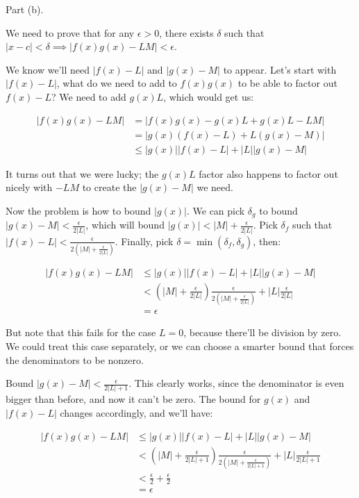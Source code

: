 \documentclass{oxmathproblems}
\begin{document}
\begin{questions}
\begin{solution}
\begin{enumerate}[label=(\alph*)]
    Part (b).

    We need to prove that for any $\epsilon > 0$, there exists $\delta$ such that $|x-c| < \delta \implies |f(x)g(x) - LM| < \epsilon$.
    
    We know we'll need $|f(x) - L|$ and $|g(x) - M|$ to appear. Let's start with $|f(x) - L|$, what do we need to add to
    $f(x)g(x)$ to be able to factor out $f(x)-L$? We need to add $g(x)L$, which would get us:
    
    \begin{align*}
      |f(x)g(x) - LM| 
      & = |f(x)g(x) - g(x)L + g(x)L - LM| \\
      & = |g(x)(f(x)-L) + L(g(x)-M)| \\
      & \leq |g(x)||f(x)-L| + |L||g(x)-M|
    \end{align*}

    It turns out that we were lucky; the $g(x)L$ factor also happens to factor out nicely with $- LM$ to create the $|g(x)-M|$ we need.

    Now the problem is how to bound $|g(x)|$. We can pick $\delta_{g}$ to bound $|g(x)-M| < \frac{\epsilon}{2|L|}$,
    which will bound $|g(x)| < |M| + \frac{\epsilon}{2|L|}$. Pick $\delta_{f}$ such that $|f(x)-L| < \frac{\epsilon}{2(|M| + \frac{\epsilon}{2|L|})}$.
    Finally, pick $\delta = \min(\delta_{f}, \delta_{g})$, then:

    \begin{align*}
      |f(x)g(x) - LM|
      & \leq |g(x)||f(x)-L| + |L||g(x)-M| \\
      & < \left(|M| + \frac{\epsilon}{2|L|}\right) \frac{\epsilon}{2(|M| + \frac{\epsilon}{2|L|})} + |L|\frac{\epsilon}{2|L|} \\
      & = \epsilon
    \end{align*}
  \end{enumerate}

  But note that this fails for the case $L = 0$, because there'll be division by zero. We could treat this case separately, or we can choose a smarter bound that forces the
  denominators to be nonzero.

  Bound $|g(x)-M| < \frac{\epsilon}{2|L|+1}$. This clearly works, since the denominator is even bigger than before, and now it can't be zero. The bound for
  $g(x)$ and $|f(x)-L|$ changes accordingly, and we'll have:

  \begin{align*}
    |f(x)g(x) - LM|
    & \leq |g(x)||f(x)-L| + |L||g(x)-M| \\
    & < \left(|M| + \frac{\epsilon}{2|L|+1}\right) \frac{\epsilon}{2\left(|M| + \frac{\epsilon}{2|L|+1}\right)} + |L|\frac{\epsilon}{2|L|+1} \\
    & < \frac{\epsilon}{2} + \frac{\epsilon}{2} \\
    & = \epsilon
  \end{align*}
\end{solution}



\end{questions}
\end{document}
